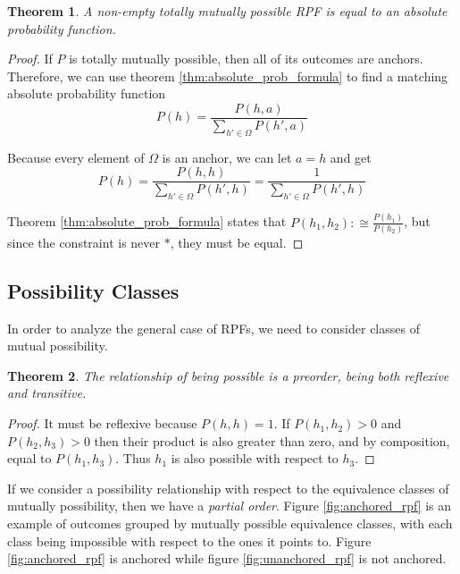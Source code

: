 \documentclass[twoside]{article}
\theoremstyle{plain}%
\newtheorem{theorem}{Theorem}[section]
\theoremstyle{definition}
\theoremstyle{remark}
\begin{document}
\begin{theorem}
A non-empty totally mutually possible RPF is equal to an absolute probability function.
\end{theorem}

\begin{proof}
If \(P\) is totally mutually possible, then all of its outcomes are anchors. Therefore, we can use theorem \ref{thm:absolute_prob_formula} to find a matching absolute probability function
\[P(h) = \frac{P(h, a)}{\sum_{h' \in \Omega}P(h', a)}\]

Because every element of \(\Omega\) is an anchor, we can let \(a = h\) and get
\[P(h) = \frac{P(h, h)}{\sum_{h' \in \Omega}P(h', h)}=\frac{1}{\sum_{h' \in \Omega}P(h', h)}\]

Theorem \ref{thm:absolute_prob_formula} states that \(P(h_1, h_2) :\cong \frac{P(h_1)}{P(h_2)}\), but since the constraint is never \(\ast\), they must be equal.
\end{proof}

\subsection{Possibility Classes}

In order to analyze the general case of RPFs, we need to consider classes of mutual possibility.

\begin{theorem}
The relationship of being possible is a \textit{preorder}, being both reflexive and transitive.
\end{theorem}

\begin{proof}
It must be reflexive because \(P(h, h) = 1\). If \(P(h_1, h_2) > 0\) and \(P(h_2, h_3) > 0\) then their product is also greater than zero, and by composition, equal to \(P(h_1, h_3)\). Thus \(h_1\) is also possible with respect to \(h_3\).
\end{proof}

If we consider a possibility relationship with respect to the equivalence classes of mutually possibility, then we have a \textit{partial order}. Figure \ref{fig:anchored_rpf} is an example of outcomes grouped by mutually possible equivalence classes, with each class being impossible with respect to the ones it points to. Figure \ref{fig:anchored_rpf} is anchored while figure \ref{fig:unanchored_rpf} is not anchored.
\end{document}
